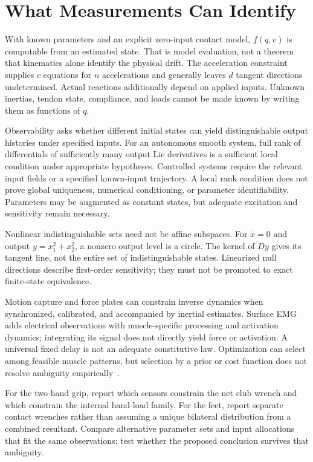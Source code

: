 \section{What Measurements Can Identify}
\label{sec:ch9:observability}

With known parameters and an explicit zero-input contact model, $f(q,v)$ is computable from an estimated state. That is model evaluation, not a theorem that kinematics alone identify the physical drift. The acceleration constraint supplies $c$ equations for $n$ accelerations and generally leaves $d$ tangent directions undetermined. Actual reactions additionally depend on applied inputs. Unknown inertias, tendon state, compliance, and loads cannot be made known by writing them as functions of $q$.

Observability asks whether different initial states can yield distinguishable output histories under specified inputs. For an autonomous smooth system, full rank of differentials of sufficiently many output Lie derivatives is a sufficient local condition under appropriate hypotheses. Controlled systems require the relevant input fields or a specified known-input trajectory. A local rank condition does not prove global uniqueness, numerical conditioning, or parameter identifiability. Parameters may be augmented as constant states, but adequate excitation and sensitivity remain necessary.

Nonlinear indistinguishable sets need not be affine subspaces. For $\dot x=0$ and output $y=x_1^2+x_2^2$, a nonzero output level is a circle. The kernel of $Dy$ gives its tangent line, not the entire set of indistinguishable states. Linearized null directions describe first-order sensitivity; they must not be promoted to exact finite-state equivalence.

Motion capture and force plates can constrain inverse dynamics when synchronized, calibrated, and accompanied by inertial estimates. Surface EMG adds electrical observations with muscle-specific processing and activation dynamics; integrating its signal does not directly yield force or activation. A universal fixed delay is not an adequate constitutive law. Optimization can select among feasible muscle patterns, but selection by a prior or cost function does not resolve ambiguity empirically~\cite{Zajac1989}.

For the two-hand grip, report which sensors constrain the net club wrench and which constrain the internal hand-load family. For the feet, report separate contact wrenches rather than assuming a unique bilateral distribution from a combined resultant. Compare alternative parameter sets and input allocations that fit the same observations; test whether the proposed conclusion survives that ambiguity.

